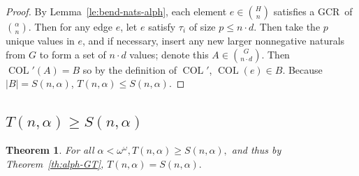 \documentclass[11pt]{article}
\newcommand{\om}{\omega}
\newcommand{\COL}{\operatorname{COL}}
\newcommand{\gencrulenospace}{GCR}
\newcommand{\gencrule}{\gencrulenospace~}
\newcommand{\numpoints}{n}
\newcommand{\Commonconst}{A}
\newcommand{\Rareconst}{B}
\theoremstyle{plain}
\newtheorem{theorem}{Theorem}[section]
\theoremstyle{definition}
\begin{document}
\begin{proof}
By Lemma~\ref{le:bend-nats-alph}, each element $e \in \binom{H}{\numpoints}$ satisfies a \gencrule of $\binom{\alpha}{\numpoints}$. 
Then for any edge $e$, let $e$ satisfy $\tau_i$ of size $p \leq \numpoints \cdot d$.
Then take the $p$ unique values in $e$, and if necessary, insert any new larger nonnegative naturals from 
$G$ to form a set of $\numpoints \cdot d$ values; denote this $\Commonconst \in \binom{G}{\numpoints \cdot d}$. 
Then
$\COL'(\Commonconst) = \Rareconst$ so by the definition of $\COL'$, $\COL(e) \in \Rareconst$. 
Because $|\Rareconst| = S(\numpoints, \alpha)$, $T(\numpoints,\alpha) \leq S(\numpoints, \alpha)$.
\end{proof}

\subsection{\texorpdfstring{$T(\numpoints,\alpha)\geq S(\numpoints,\alpha)$}{T(\numpoints, alpha) >= S(\numpoints, alpha)}}
\begin{theorem}
    \label{th:alph-LT}
    For all $\alpha < \om^\om, T\left(\numpoints, \alpha\right) \geq S\left(\numpoints, \alpha\right),$
    and thus by Theorem~\ref{th:alph-GT}, $T\left(\numpoints, \alpha\right) = S\left(\numpoints, \alpha\right).$
\end{theorem}
\end{document}

